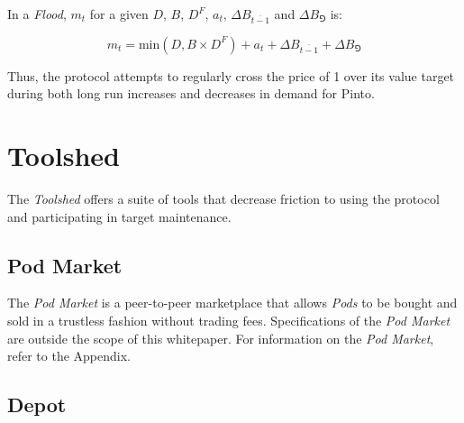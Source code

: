 \documentclass[tikz]{article}
\makeatletter
\newenvironment{keepunit}{%
  \par\penalty0\begingroup
  \edef\keepunitparskip{\the\parskip}%
  \noindent\begin{minipage}[t]{\linewidth}%
  \setlength{\parskip}{\keepunitparskip}%
  \@minipagefalse
}{%
  \end{minipage}\par\endgroup
}
\newcommand{\term}[1]{\textsl{#1}}
\newcommand{\Pinto}{} %
\renewcommand{\Pinto}{\usebox{\cachePinto}}
\makeatother
\begin{document}
\vspace{-0.05cm}

\begin{keepunit}
In a \term{Flood}, $m_{t}$ for a given $D$, $B$, $D^{F}$, $a_{t}$, $\Delta B_{\overline{t-1}}$ and $\Delta B_{\Game}$ is:

\vspace{-0.05cm}

    $$
        m_{t} = 
            \text{min}(D, B \times D^{F}) + 
            a_{t} + 
            \Delta B_{\overline{t-1}} + 
            \Delta B_{\Game}
    $$

\vspace{-0.05cm}

Thus, the protocol attempts to regularly cross the price of \Pinto1 over its value target during both long run increases and decreases in demand for Pinto.
\end{keepunit}


\section{Toolshed}
\vspace{0.1cm}

The \term{Toolshed} offers a suite of tools that decrease friction to using the protocol and participating in target maintenance.


\vspace{0.1cm}
\subsection{Pod Market}
\vspace{0.1cm}

The \term{Pod Market} is a peer-to-peer marketplace that allows \term{Pods} to be bought and sold in a trustless fashion without trading fees. Specifications of the \term{Pod Market} are outside the scope of this whitepaper. For information on the \term{Pod Market}, refer to the Appendix.


\vspace{0.1cm}
\enlargethispage{\baselineskip}
\subsection{Depot}
\vspace{0.1cm}
\end{document}
